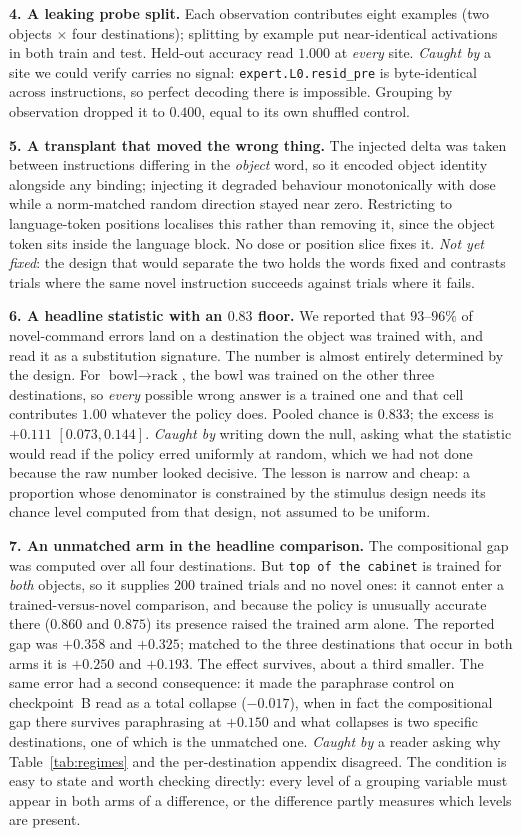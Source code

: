 \documentclass{article}
\begin{document}
\textbf{4. A leaking probe split.} Each observation contributes eight examples (two objects
$\times$ four destinations); splitting by example put near-identical activations in both train
and test. Held-out accuracy read $1.000$ at \emph{every} site. \emph{Caught by} a site we could
verify carries no signal: \texttt{expert.L0.resid\_pre} is byte-identical across instructions,
so perfect decoding there is impossible. Grouping by observation dropped it to $0.400$, equal to
its own shuffled control.

\textbf{5. A transplant that moved the wrong thing.} The injected delta was taken between
instructions differing in the \emph{object} word, so it encoded object identity alongside any
binding; injecting it degraded behaviour monotonically with dose while a norm-matched random
direction stayed near zero. Restricting to language-token positions localises this rather than
removing it, since the object token sits inside the language block. No dose or position slice
fixes it. \emph{Not yet fixed}: the design that would separate the two holds the words fixed and
contrasts trials where the same novel instruction succeeds against trials where it fails.

\textbf{6. A headline statistic with an $0.83$ floor.} We reported that $93$--$96\%$ of
novel-command errors land on a destination the object was trained with, and read it as a
substitution signature. The number is almost entirely determined by the design. For
$\textrm{bowl} \to \textrm{rack}$, the bowl was trained on the other three destinations, so
\emph{every} possible wrong answer is a trained one and that cell contributes $1.00$ whatever
the policy does. Pooled chance is $0.833$; the excess is $+0.111$ $[0.073, 0.144]$.
\emph{Caught by} writing down the null, asking what the statistic would read if the policy
erred uniformly at random, which we had not done because the raw number looked decisive.
The lesson is narrow and cheap: a proportion whose denominator is constrained by the stimulus
design needs its chance level computed from that design, not assumed to be uniform.

\textbf{7. An unmatched arm in the headline comparison.} The compositional gap was computed
over all four destinations. But \texttt{top of the cabinet} is trained for \emph{both} objects,
so it supplies $200$ trained trials and no novel ones: it cannot enter a trained-versus-novel
comparison, and because the policy is unusually accurate there ($0.860$ and $0.875$) its
presence raised the trained arm alone. The reported gap was $+0.358$ and $+0.325$; matched to
the three destinations that occur in both arms it is $+0.250$ and $+0.193$. The effect survives,
about a third smaller. The same error had a second consequence: it made the paraphrase control
on checkpoint~B read as a total collapse ($-0.017$), when in fact the compositional gap there
survives paraphrasing at $+0.150$ and what collapses is two specific destinations, one of which
is the unmatched one. \emph{Caught by} a reader asking why Table~\ref{tab:regimes} and the
per-destination appendix disagreed. The condition is easy to state and worth checking directly:
every level of a grouping variable must appear in both arms of a difference, or the difference
partly measures which levels are present.
\end{document}

